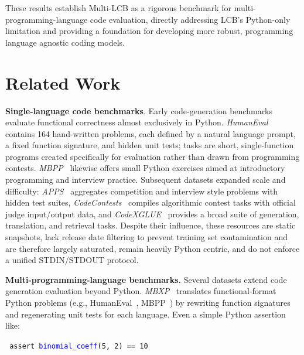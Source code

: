 \documentclass{article} %
\begin{document}
These results establish Multi-LCB as a rigorous benchmark for multi-programming-language code evaluation, directly addressing LCB’s Python-only limitation and providing a foundation for developing more robust, programming language agnostic coding models.

\section{Related Work}
\label{sec_related_work}

\textbf{Single-language code benchmarks}. 
Early code-generation benchmarks evaluate functional correctness almost exclusively in Python. \textit{HumanEval}~\citep{chen2021evaluating} contains 164 hand-written problems, each defined by a natural language prompt, a fixed function signature, and hidden unit tests; tasks are short, single-function programs created specifically for evaluation rather than drawn from programming contests. \textit{MBPP}~\citep{austin2021program} likewise offers small Python exercises aimed at introductory programming and interview practice. Subsequent datasets expanded scale and difficulty: \textit{APPS}~\citep{hendrycks2021measuring} aggregates competition and interview style problems with hidden test suites, \textit{CodeContests}~\citep{li2022competition} compiles algorithmic contest tasks with official judge input/output data, and \textit{CodeXGLUE}~\citep{lu2021codexglue} provides a broad suite of generation, translation, and retrieval tasks.
Despite their influence, these resources are static snapshots, lack release date filtering to prevent training set contamination and are therefore largely saturated, remain heavily Python centric, and do not enforce a unified STDIN/STDOUT protocol. %

\textbf{Multi-programming-language benchmarks.}
Several datasets extend code generation evaluation beyond Python. \textit{MBXP}~\citep{athiwaratkun2022multi} translates functional-format Python problems (e.g., HumanEval~\citep{chen2021evaluating}, MBPP~\citep{austin2021program}) by rewriting function signatures and regenerating unit tests for each language. Even a simple Python assertion like: 

\texttt{ \qquad \qquad \qquad \qquad
\textcolor{deepgreen}{assert}\ 
\textcolor{blue}{binomial\_coeff}\textcolor{black}{(}\textcolor{deeporange}{5}\textcolor{black}{, }\textcolor{deeporange}{2}\textcolor{black}{)}\ 
\textcolor{black}{==}\ 
\textcolor{deeporange}{10}
} 
\end{document}

